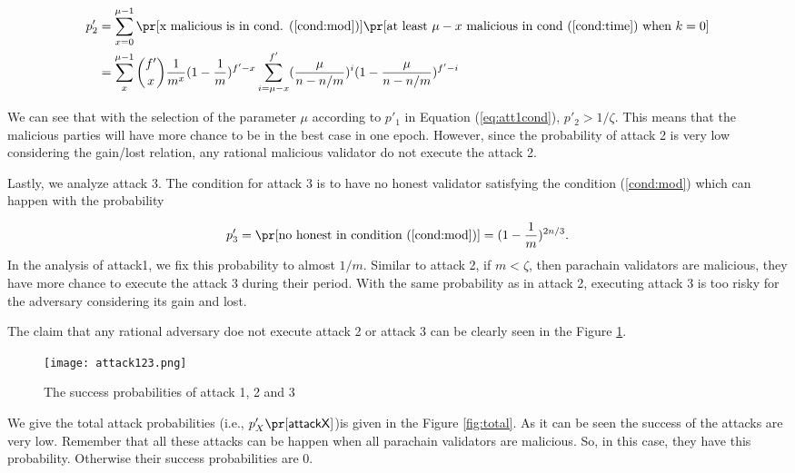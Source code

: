\begin{align}\label{eq:att2cond}
    p'_2 &= \sum_{x=0}^{\mu-1}\pr[\text{x malicious is in cond. (\ref{cond:mod})}]\pr[\text{at least }\mu-x\text{ malicious in cond (\ref{cond:time}) when } k = 0] \nonumber \\
    &= \sum_x^{\mu-1}\binom{f'}{x}\frac{1}{m^{x}}(1-\frac{1}{m})^{f'-x}\sum_{i = \mu-x}^{f'}(\frac{\mu}{n-n/m})^{i}(1-\frac{\mu}{n-n/m})^{f'-i}
\end{align} 

We can see that with the selection of the parameter $\mu$ according to $p'_1$ in Equation (\ref{eq:att1cond}), $p'_2 > 1/\zeta$. This means that the malicious parties will have more chance to be in the best case in one epoch. However, since the probability of attack 2 is very low considering the gain/lost relation, any rational malicious validator do not execute the attack 2.


Lastly, we analyze attack 3. The  condition for attack 3 is to have no honest validator satisfying the condition (\ref{cond:mod}) which can happen with the probability

\begin{equation}\label{eq:att3cond}
    p'_3 = \pr[\text{no honest in condition (\ref{cond:mod})}] = (1-\frac{1}{m})^{2n/3}.
\end{equation}
In the analysis of attack1, we fix this probability to almost $1/m$. Similar to attack 2, if $m < \zeta$, then parachain validators are malicious, they have more chance to execute the attack 3 during their period. With the same probability as in attack 2, executing attack 3 is too risky for the adversary considering its gain and lost.

The claim that any rational adversary doe not execute attack 2 or attack 3 can be clearly seen in the  Figure \ref{fig:attack123}.

\begin{figure}[h]\centering
	  \texttt{[image: attack123.png]}
	  \caption{The success probabilities of attack 1, 2 and 3}
	  \label{fig:attack123}
\end{figure}


We give the total attack probabilities (i.e., $p'_X\pr[\mathsf{attack X}]$)is given in the Figure \ref{fig:total}. As it can be seen the success of the attacks are very low. Remember that all these attacks can be happen when all parachain validators are malicious. So, in this case, they have this probability. Otherwise their success probabilities are 0.

